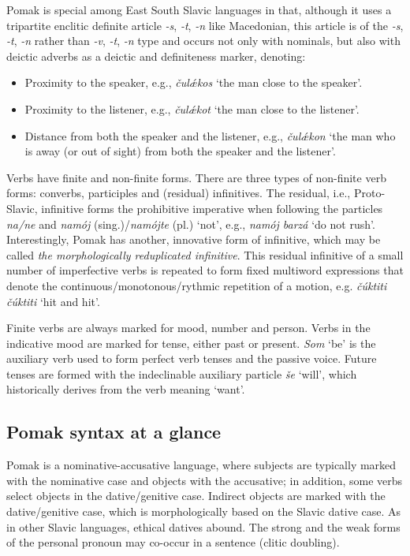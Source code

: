 \documentclass[output=paper,colorlinks,citecolor=brown]{langscibook}
\begin{document}
Pomak is special among East South Slavic languages in that, although it uses a tripartite enclitic definite article \textit{-s}, \textit{-t}, \textit{-n} \citep{adamou,constandinidestrip,krimpas} like Macedonian, this article is of the \textit{-s}, \textit{-t}, \textit{-n} rather than \textit{-v}, \textit{-t}, \textit{-n} type and occurs not only with nominals, but also with deictic adverbs as a deictic and definiteness marker, denoting:

\begin{itemize}
\item  Proximity to the speaker, e.g., \textit{čul{\'{\ae}}kos} `the man close to the speaker'. 
\item Proximity to the listener, e.g., \textit{čul{\'{\ae}}kot} `the man close to the listener'. 
\item Distance from both the speaker and the listener, e.g., \textit{čul{\'{\ae}}kon} `the man who is away (or out of sight) from both the speaker and the listener'.
\end{itemize}

Verbs have finite and non-finite forms. There are three types of non-finite verb forms: converbs, participles and (residual) infinitives. The residual, i.e., Proto-Slavic, infinitive forms the prohibitive imperative when following the particles \textit{na/ne} and \textit{namój} (sing.)/\textit{namójte} (pl.) `not', e.g., \textit{namój barzá} `do not rush'. Interestingly, Pomak has another, innovative form of infinitive, which may be called \textit{the morphologically reduplicated infinitive}. This residual infinitive of a small number of imperfective verbs is repeated to form fixed multiword expressions that denote the continuous/monotonous/rythmic repetition of a motion, e.g. \textit{čúktiti čúktiti} `hit and hit'.

 Finite verbs are always marked for mood, number and person. Verbs in the indicative mood are marked for tense, either past or present. \textit{Som} `be' is the auxiliary verb used to form perfect verb tenses and the passive voice. Future tenses are formed with the indeclinable auxiliary particle \textit{še} `will', which historically derives from the verb meaning `want'.


\subsection{Pomak syntax at a glance}
\label{sec:syntax}


Pomak is a nominative-accusative language, where subjects are typically marked with the nominative case and objects with the accusative; in addition, some verbs select objects in the dative/genitive case. Indirect objects are marked with the dative/genitive case, which is morphologically based on the Slavic dative case.  As in other Slavic languages, ethical datives abound. %
The strong and the weak forms of the personal pronoun may co-occur in a sentence (clitic doubling).
\end{document}
